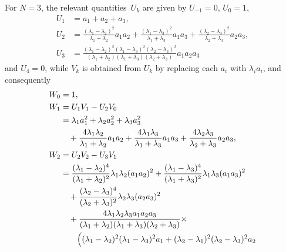\documentclass[10pt,a4paper]{article} \pdfoutput=1 
\begin{document}
\begin{example}
  \label{ex:DP-three-peakons}
  For $N=3$, the relevant quantities~$U_k$ are given by
  $U_{-1} = 0$,
  $U_0 = 1$,
  \begin{equation*}
    \begin{split}
      U_1 &= a_1+a_2+a_3
      ,
      \\
      U_2 &=
      \frac{(\lambda_1-\lambda_2)^2}{\lambda_1+\lambda_2} a_1 a_2
      +\frac{(\lambda_1-\lambda_3)^2}{\lambda_1+\lambda_3} a_1 a_3
      +\frac{(\lambda_2-\lambda_3)^2}{\lambda_2+\lambda_3} a_2 a_3
      ,
      \\
      U_3 &=
      \frac{(\lambda_1-\lambda_2)^2 (\lambda_1-\lambda_3)^2 (\lambda_2-\lambda_3)^2}
      {(\lambda_1+\lambda_2) (\lambda_1+\lambda_3) (\lambda_2+\lambda_3)}
      a_1 a_2 a_3
    \end{split}
  \end{equation*}
  and $U_4 = 0$,
  while $V_k$ is obtained from $U_k$ by replacing each $a_i$ with $\lambda_i a_i$,
  and consequently
  \begin{equation*}
    \begin{split}
      W_0 &= 1
      , \\
      W_1 &= U_1 V_1 - U_2 V_0
      \\ &
      = \lambda_1 a_1^2 + \lambda_2 a_2^2 + \lambda_3 a_3^2
      \\ & \quad
      + \frac{4 \lambda_1 \lambda_2}{\lambda_1+\lambda_2} a_1 a_2
      + \frac{4 \lambda_1 \lambda_3}{\lambda_1+\lambda_3} a_1 a_3
      + \frac{4 \lambda_2 \lambda_3}{\lambda_2+\lambda_3} a_2 a_3
      ,
      \\
      W_2 &= U_2 V_2 - U_3 V_1
      \\ &
      = \frac{(\lambda_1-\lambda_2)^4}{(\lambda_1+\lambda_2)^2} \lambda_1 \lambda_2 (a_1 a_2)^2
      + \frac{(\lambda_1-\lambda_3)^4}{(\lambda_1+\lambda_3)^2} \lambda_1 \lambda_3 (a_1 a_3)^2
      \\ & \quad
      + \frac{(\lambda_2-\lambda_3)^4}{(\lambda_2+\lambda_3)^2} \lambda_2 \lambda_3 (a_2 a_3)^2
      \\ & \quad
      +
      \frac{4 \lambda_1 \lambda_2 \lambda_3 a_1 a_2 a_3}
      {(\lambda_1+\lambda_2)(\lambda_1+\lambda_3)(\lambda_2+\lambda_3)}
      \times
      \\ & \qquad
      \Bigl(
        (\lambda_1-\lambda_2)^2 (\lambda_1-\lambda_3)^2 a_1
        + (\lambda_2-\lambda_1)^2 (\lambda_2-\lambda_3)^2 a_2
      \\

\end{split}
\end{equation*}
\end{example}
\end{document}
